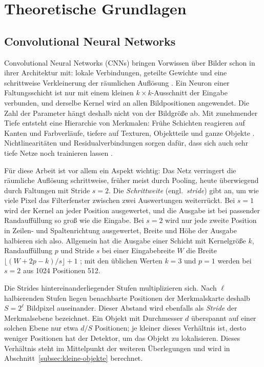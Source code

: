 \chapter{Theoretische Grundlagen}
\label{kap:theorie}

\section{Convolutional Neural Networks}
\label{sec:cnn}

Convolutional Neural Networks (CNNs) bringen Vorwissen über Bilder schon in
ihrer Architektur mit: lokale Verbindungen, geteilte Gewichte und eine
schrittweise Verkleinerung der räumlichen Auflösung
\parencite{lecun1998,goodfellow2016}. Ein Neuron einer Faltungsschicht ist nur
mit einem kleinen $k\times k$-Ausschnitt der Eingabe verbunden, und derselbe
Kernel wird an allen Bildpositionen angewendet. Die Zahl der Parameter hängt
deshalb nicht von der Bildgröße ab. Mit zunehmender Tiefe entsteht eine
Hierarchie von Merkmalen: Frühe Schichten reagieren auf Kanten und
Farbverläufe, tiefere auf Texturen, Objektteile und ganze Objekte
\parencite{zeiler2014}. Nichtlinearitäten und Residualverbindungen sorgen dafür,
dass sich auch sehr tiefe Netze noch trainieren lassen
\parencite{krizhevsky2012,he2016}.

 Für diese Arbeit ist vor allem ein
Aspekt wichtig: Das Netz verringert die räumliche Auflösung schrittweise, früher
meist durch Pooling, heute überwiegend durch Faltungen mit Stride $s=2$.
Die \emph{Schrittweite} (engl.\ \emph{stride}) gibt an, um wie viele Pixel das
Filterfenster zwischen zwei Auswertungen weiterrückt. Bei $s=1$ wird der Kernel
an jeder Position ausgewertet, und die Ausgabe ist bei passender Randauffüllung
so groß wie die Eingabe. Bei $s=2$ wird nur jede zweite Position in Zeilen- und
Spaltenrichtung ausgewertet, Breite und Höhe der Ausgabe halbieren sich also.
Allgemein hat die Ausgabe einer Schicht mit Kernelgröße $k$, Randauffüllung $p$
und Stride $s$ bei einer Eingabebreite $W$ die Breite
$\lfloor (W+2p-k)/s \rfloor + 1$ \parencite{dumoulin2016}; mit den üblichen
Werten $k=3$ und $p=1$ werden bei $s=2$ aus 1024 Positionen 512.

Die Strides hintereinanderliegender Stufen multiplizieren sich. Nach
$\ell$ halbierenden Stufen liegen benachbarte Positionen der Merkmalskarte
deshalb $S = 2^{\ell}$ Bildpixel auseinander. Dieser Abstand wird
ebenfalls als \emph{Stride} der Merkmalsebene bezeichnet. Ein Objekt mit
Durchmesser $d$ überspannt auf einer solchen Ebene nur etwa $d/S$ Positionen;
je kleiner dieses Verhältnis ist, desto weniger Positionen hat der Detektor, um
das Objekt zu lokalisieren. Dieses Verhältnis steht im Mittelpunkt der weiteren
Überlegungen und wird in Abschnitt~\ref{subsec:kleine-objekte} berechnet.

